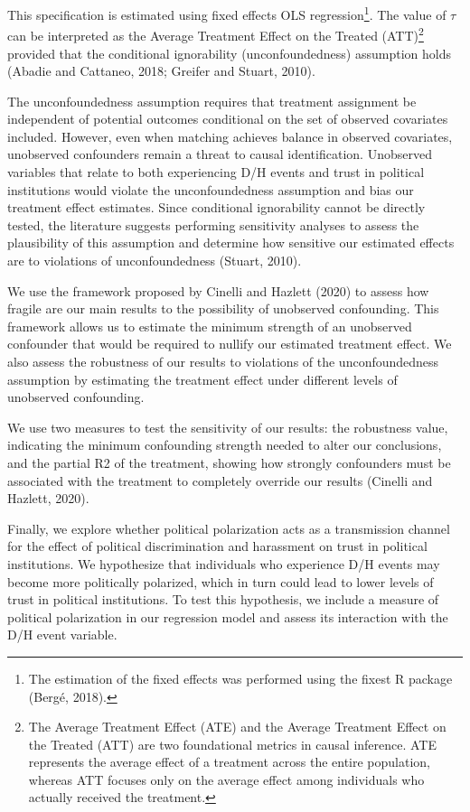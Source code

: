 \documentclass{article}
\begin{document}
This specification is estimated using fixed effects OLS regression\footnote{The estimation of the fixed effects was performed using the fixest R package (Bergé, 2018).}. The value of \( \tau \) can be interpreted as the Average Treatment Effect on the Treated (ATT)\footnote{The Average Treatment Effect (ATE) and the Average Treatment Effect on the Treated (ATT) are two foundational metrics in causal inference. ATE represents the average effect of a treatment across the entire population, whereas ATT focuses only on the average effect among individuals who actually received the treatment.} provided that the conditional ignorability (unconfoundedness) assumption holds (Abadie and Cattaneo, 2018; Greifer and Stuart, 2010).

The unconfoundedness assumption requires that treatment assignment be independent of potential outcomes conditional on the set of observed covariates included. However, even when matching achieves balance in observed covariates, unobserved confounders remain a threat to causal identification. Unobserved variables that relate to both experiencing D/H events and trust in political institutions would violate the unconfoundedness assumption and bias our treatment effect estimates. Since conditional ignorability cannot be directly tested, the literature suggests performing sensitivity analyses to assess the plausibility of this assumption and determine how sensitive our estimated effects are to violations of unconfoundedness (Stuart, 2010).

We use the framework proposed by Cinelli and Hazlett (2020) to assess how fragile are our main results to the possibility of unobserved confounding. This framework allows us to estimate the minimum strength of an unobserved confounder that would be required to nullify our estimated treatment effect. We also assess the robustness of our results to violations of the unconfoundedness assumption by estimating the treatment effect under different levels of unobserved confounding.

We use two measures to test the sensitivity of our results: the robustness value, indicating the minimum confounding strength needed to alter our conclusions, and the partial R2 of the treatment, showing how strongly confounders must be associated with the treatment to completely override our results (Cinelli and Hazlett, 2020).

Finally, we explore whether political polarization acts as a transmission channel for the effect of political discrimination and harassment on trust in political institutions. We hypothesize that individuals who experience D/H events may become more politically polarized, which in turn could lead to lower levels of trust in political institutions. To test this hypothesis, we include a measure of political polarization in our regression model and assess its interaction with the D/H event variable.
\end{document}
